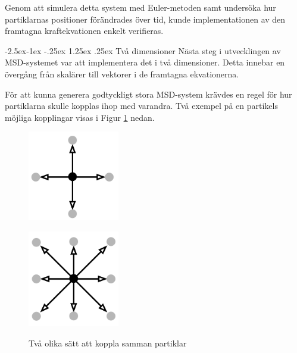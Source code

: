 \documentclass[a4paper,12pt,oneside,final,swedish]{extarticle}
\makeatletter
\renewcommand\paragraph{\@startsection{paragraph}{4}{\z@}%
            {-2.5ex\@plus -1ex \@minus -.25ex}%
            {1.25ex \@plus .25ex}%
            {\normalfont\normalsize\bfseries}}
\makeatother
\begin{document}
Genom att simulera detta system med Euler-metoden samt undersöka hur partiklarnas positioner förändrades över tid, kunde implementationen av den framtagna kraftekvationen enkelt verifieras.

\paragraph{Två dimensioner}
Nästa steg i utvecklingen av MSD-systemet var att implementera det i två dimensioner. 
Detta innebar en övergång från skalärer till vektorer i de framtagna ekvationerna.

För att kunna generera godtyckligt stora MSD-system krävdes en regel för hur partiklarna skulle kopplas ihop med varandra. Två exempel på en partikels möjliga kopplingar visas i Figur \ref{2D_Neighbors} nedan.

\begin{figure}
  \begin{minipage}[b]{.5\linewidth}
    \centering
    \includegraphics[width=4cm]{Bilder/2D_4Neighbors.png} 
    \label{fig:1a}
  \end{minipage}
  \begin{minipage}[b]{.5\linewidth}
    \centering
    \includegraphics[width=4cm]{Bilder/2D_8Neighbors.png} 
    \label{fig:1b}
  \end{minipage}
  \caption{Två olika sätt att koppla samman partiklar}\label{2D_Neighbors}
\end{figure}
\end{document}

